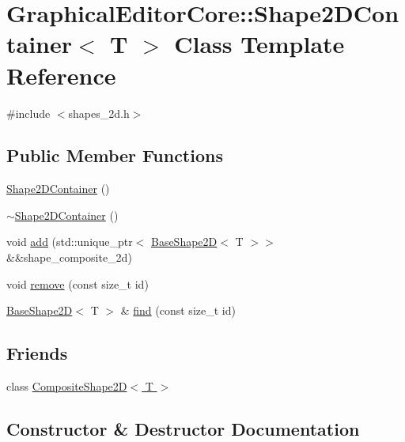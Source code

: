 \hypertarget{classGraphicalEditorCore_1_1Shape2DContainer}{}\section{Graphical\+Editor\+Core\+:\+:Shape2\+D\+Container$<$ T $>$ Class Template Reference}
\label{classGraphicalEditorCore_1_1Shape2DContainer}


{\ttfamily \#include $<$shapes\+\_\+2d.\+h$>$}

\subsection*{Public Member Functions}
\begin{DoxyCompactItemize}
\item 
\hyperlink{classGraphicalEditorCore_1_1Shape2DContainer_a07a8d036141605e8119aa861d92b621c}{Shape2\+D\+Container} ()
\item 
\hyperlink{classGraphicalEditorCore_1_1Shape2DContainer_a73f2c173b8eaadd296591251d95abdb2}{$\sim$\+Shape2\+D\+Container} ()
\item 
void \hyperlink{classGraphicalEditorCore_1_1Shape2DContainer_a319eaa4224faae3a76720132d9bc7c22}{add} (std\+::unique\+\_\+ptr$<$ \hyperlink{classGraphicalEditorCore_1_1BaseShape2D}{Base\+Shape2D}$<$ T $>$$>$ \&\&shape\+\_\+composite\+\_\+2d)
\item 
void \hyperlink{classGraphicalEditorCore_1_1Shape2DContainer_aaba57542cb133dfbe71c4e0857cccbc2}{remove} (const size\+\_\+t id)
\item 
\hyperlink{classGraphicalEditorCore_1_1BaseShape2D}{Base\+Shape2D}$<$ T $>$ \& \hyperlink{classGraphicalEditorCore_1_1Shape2DContainer_a855ae4eb2ca27b643c24cc5eea414711}{find} (const size\+\_\+t id)
\end{DoxyCompactItemize}
\subsection*{Friends}
\begin{DoxyCompactItemize}
\item 
class \hyperlink{classGraphicalEditorCore_1_1Shape2DContainer_ad3ba7f8293bd2db1bdd18a1f4b2f2eb8}{Composite\+Shape2\+D$<$ T $>$}
\end{DoxyCompactItemize}


\subsection{Constructor \& Destructor Documentation}
